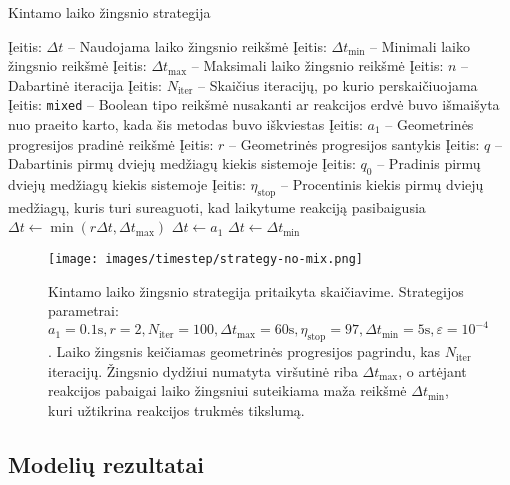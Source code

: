 \begin{algorithm}[h]
  \caption{Kintamo laiko žingsnio strategija}\label{alg:scgq}
  \begin{algorithmic}[1]
    \STATE Įeitis: $\Delta t$ -- Naudojama laiko žingsnio reikšmė
    \STATE Įeitis: $\Delta t_\text{min}$ -- Minimali laiko žingsnio reikšmė
    \STATE Įeitis: $\Delta t_\text{max}$ -- Maksimali laiko žingsnio reikšmė
    \STATE Įeitis: $n$ -- Dabartinė iteracija
    \STATE Įeitis: $N_{\text{iter}}$ -- Skaičius iteracijų, po kurio perskaičiuojama
    \STATE Įeitis: \texttt{mixed} -- Boolean tipo reikšmė nusakanti ar reakcijos erdvė buvo išmaišyta nuo praeito karto, kada šis metodas buvo iškviestas
    \STATE Įeitis: $a_1$ -- Geometrinės progresijos pradinė reikšmė
    \STATE Įeitis: $r$ -- Geometrinės progresijos santykis
    \STATE Įeitis: $q$ -- Dabartinis pirmų dviejų medžiagų kiekis sistemoje
    \STATE Įeitis: $q_0$ -- Pradinis pirmų dviejų medžiagų kiekis sistemoje
    \STATE Įeitis: $\eta_\text{stop}$ -- Procentinis kiekis pirmų dviejų medžiagų, kuris turi sureaguoti, kad laikytume reakciją pasibaigusia
      \STATE $\Delta t \gets \min(r\Delta t, \Delta t_\text{max})$
    \ENDIF
      \STATE $\Delta t \gets a_1$
    \ENDIF
      \STATE $\Delta t \gets \Delta t_\text{min}$
    \ENDIF
  \end{algorithmic}
\end{algorithm}

\begin{figure}[h!]
  \centering
  \texttt{[image: images/timestep/strategy-no-mix.png]}
  \caption{Kintamo laiko žingsnio strategija pritaikyta skaičiavime. Strategijos parametrai: $a_1=0.1\text{s}, r=2, N_\text{iter}=100,\Delta t_\text{max}=60\text{s}, \eta_\text{stop}=97, \Delta t_\text{min}=5\text{s}, \varepsilon=10^{-4}$. Laiko žingsnis keičiamas geometrinės progresijos pagrindu, kas $N_\text{iter}$ iteracijų. Žingsnio dydžiui numatyta viršutinė riba $\Delta t_\text{max}$, o artėjant reakcijos pabaigai laiko žingsniui suteikiama maža reikšmė $\Delta t_\text{min}$, kuri užtikrina reakcijos trukmės tikslumą.  }
  \label{fig:time-step-strategy-visual}
\end{figure}

\newpage
\subsection{Modelių rezultatai}

